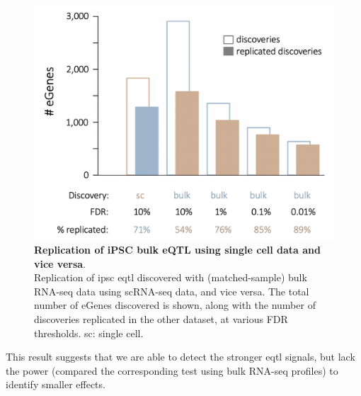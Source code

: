 \begin{figure}[h]
\centering
\includegraphics[width=12cm]{Chapter3/Fig/sc_vs_bulk_eqtl.png}
\caption[iPSC eQTL (bulk vs sc)]{\textbf{Replication of iPSC bulk eQTL using single cell data and vice versa}.\\
Replication of \gls{ipsc} \gls{eqtl} discovered with (matched-sample) bulk RNA-seq data using scRNA-seq data, and vice versa.
The total number of eGenes discovered is shown, along with the number of discoveries replicated in the other dataset, at various FDR thresholds. 
sc: single cell.}
\label{fig:sc_bulk_egenes}
\end{figure}

This result suggests that we are able to detect the stronger \gls{eqtl} signals, but lack the power (compared the corresponding test using bulk RNA-seq profiles) to identify smaller effects.


